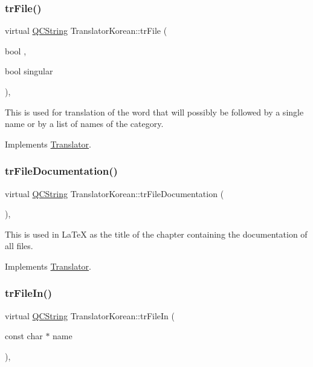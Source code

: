 \subsubsection{\texorpdfstring{trFile()}{trFile()}}
{\footnotesize\ttfamily virtual \mbox{\hyperlink{class_q_c_string}{Q\+C\+String}} Translator\+Korean\+::tr\+File (\begin{DoxyParamCaption}\item[{bool}]{,  }\item[{bool}]{singular }\end{DoxyParamCaption})\hspace{0.3cm}{\ttfamily [inline]}, {\ttfamily [virtual]}}

This is used for translation of the word that will possibly be followed by a single name or by a list of names of the category. 

Implements \mbox{\hyperlink{class_translator}{Translator}}.

\mbox{\label{class_translator_korean_af752c722b8870b72054edb8b96408c91}} 
\subsubsection{\texorpdfstring{trFileDocumentation()}{trFileDocumentation()}}
{\footnotesize\ttfamily virtual \mbox{\hyperlink{class_q_c_string}{Q\+C\+String}} Translator\+Korean\+::tr\+File\+Documentation (\begin{DoxyParamCaption}{ }\end{DoxyParamCaption})\hspace{0.3cm}{\ttfamily [inline]}, {\ttfamily [virtual]}}

This is used in La\+TeX as the title of the chapter containing the documentation of all files. 

Implements \mbox{\hyperlink{class_translator}{Translator}}.

\mbox{\label{class_translator_korean_a97fe67f457e6c07a3b5b9f5b42c6dfc3}} 
\subsubsection{\texorpdfstring{trFileIn()}{trFileIn()}}
{\footnotesize\ttfamily virtual \mbox{\hyperlink{class_q_c_string}{Q\+C\+String}} Translator\+Korean\+::tr\+File\+In (\begin{DoxyParamCaption}\item[{const char $\ast$}]{name }\end{DoxyParamCaption})\hspace{0.3cm}{\ttfamily [inline]}, {\ttfamily [virtual]}}

